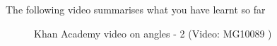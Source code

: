 	\par
      \label{m39370*eip-433}The following video summarises what you have learnt so far
    \setcounter{subfigure}{0}
	\begin{figure}[H] %
    \textnormal{Khan Academy video on angles - 2}\vspace{.1in} \nopagebreak
  \label{m39370*yt-media2}\label{m39370*yt-video2}
             { (Video:  MG10089 )}
      \vspace{2pt}
    \vspace{.1in}
 \end{figure}       \par 
      \label{m39370*uid28}
